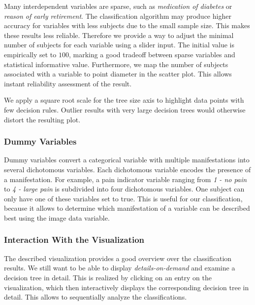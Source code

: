 \documentclass[a4paper,twoside]{style/article}
\newcommand{\com}[1]{\textcolor{orange}{\uline{#1}}}
\begin{document}
Many interdependent variables are sparse, such as \emph{medication of diabetes} or \emph{reason of early retirement}.
The classification algorithm may produce higher accuracy for variables with less subjects due to the small sample size.
This makes these results less reliable.
Therefore we provide a way to adjust the minimal number of subjects for each variable using a slider input.
The initial value is empirically set to $100$, marking a good tradeoff between sparse variables and statistical informative value.
Furthermore, we map the number of subjects associated with a variable to point diameter in the scatter plot.
This allows instant reliability assessment of the result.

We apply a square root scale for the tree size axis to highlight data points with few decision rules.
Outlier results with very large decision trees would otherwise distort the resulting plot.

%
\subsubsection{Dummy Variables}
Dummy variables convert a categorical variable with multiple manifestations into several dichotomous variables.
Each dichotomous variable encodes the presence of a manifestation.
For example, a pain indicator variable ranging from \emph{1 - no pain} to \emph{4 - large pain} is subdivided into four dichotomous variables. %
One subject can only have one of these variables set to true.
This is useful for our classification, because it allows to determine which manifestation of a variable can be described best using the image data variable.
\subsubsection{Interaction With the Visualization}
The described visualization provides a good overview over the classification results.
We still want to be able to display \emph{details-on-demand} \cite{shneiderman1996} and examine a decision tree in detail.
This is realized by clicking on an entry on the visualization, which then interactively displays the corresponding decision tree in detail.
This allows to sequentially analyze the classifications.
\end{document}
